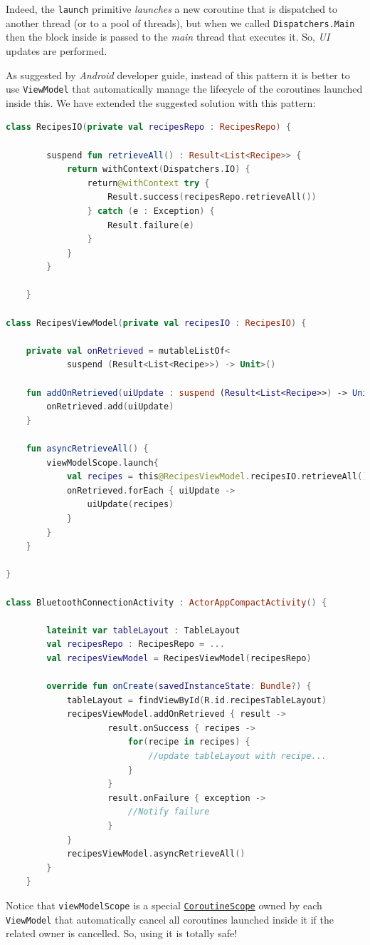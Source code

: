 Indeed, the \texttt{launch} primitive \textit{launches} a new coroutine that is dispatched to another thread (or to a pool of threads), but when we called \texttt{Dispatchers.Main} then the block inside is passed to the \textit{main} thread that executes it. So, \textit{UI} updates are performed.

As suggested by \textit{Android} developer guide, instead of this pattern it is better to use \texttt{ViewModel} that automatically manage the lifecycle of the coroutines launched inside this.
We have extended the suggested solution with this pattern:

\begin{lstlisting}[language=Kotlin]
	class RecipesIO(private val recipesRepo : RecipesRepo) {
		
		suspend fun retrieveAll() : Result<List<Recipe>> {
			return withContext(Dispatchers.IO) {
				return@withContext try {
					Result.success(recipesRepo.retrieveAll())
				} catch (e : Exception) {
					Result.failure(e)
				}
			}
		}
				
	}

class RecipesViewModel(private val recipesIO : RecipesIO) {
	
	private val onRetrieved = mutableListOf<
			suspend (Result<List<Recipe>>) -> Unit>()
	
	fun addOnRetrieved(uiUpdate : suspend (Result<List<Recipe>>) -> Unit) {
		onRetrieved.add(uiUpdate)
	}
	
	fun asyncRetrieveAll() {
		viewModelScope.launch{
			val recipes = this@RecipesViewModel.recipesIO.retrieveAll()
			onRetrieved.forEach { uiUpdate ->
				uiUpdate(recipes)
			}
		}
	}
	
}
	
class BluetoothConnectionActivity : ActorAppCompactActivity() {
		
		lateinit var tableLayout : TableLayout
		val recipesRepo : RecipesRepo = ...
		val recipesViewModel = RecipesViewModel(recipesRepo)
		
		override fun onCreate(savedInstanceState: Bundle?) {
			tableLayout = findViewById(R.id.recipesTableLayout)
			recipesViewModel.addOnRetrieved { result ->
					result.onSuccess { recipes ->
						for(recipe in recipes) {
							//update tableLayout with recipe...
						}
					}
					result.onFailure { exception ->
						//Notify failure 
					}
			}
			recipesViewModel.asyncRetrieveAll()
		}
	}
\end{lstlisting}

Notice that \texttt{viewModelScope} is a special \href{https://kotlinlang.org/api/kotlinx.coroutines/kotlinx-coroutines-core/kotlinx.coroutines/-coroutine-scope/}{\texttt{CoroutineScope}} owned by each \texttt{ViewModel} that automatically cancel all coroutines launched inside it if the related owner is cancelled. So, using it is totally safe!

